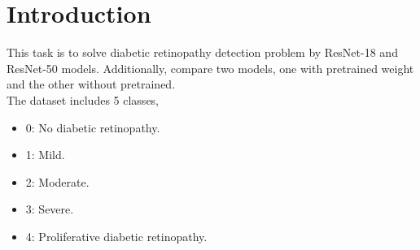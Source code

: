 \chapter{Introduction}
\indent
	This task is to solve diabetic retinopathy detection problem by ResNet-18 and ResNet-50 models. 
	Additionally, compare two models, one with pretrained weight and the other without pretrained. \\
	The dataset includes 5 classes, 
	\begin{itemize}
		\item 0: No diabetic retinopathy.
		\item 1: Mild.
		\item 2: Moderate.
		\item 3: Severe.
		\item 4: Proliferative diabetic retinopathy.
	\end{itemize}